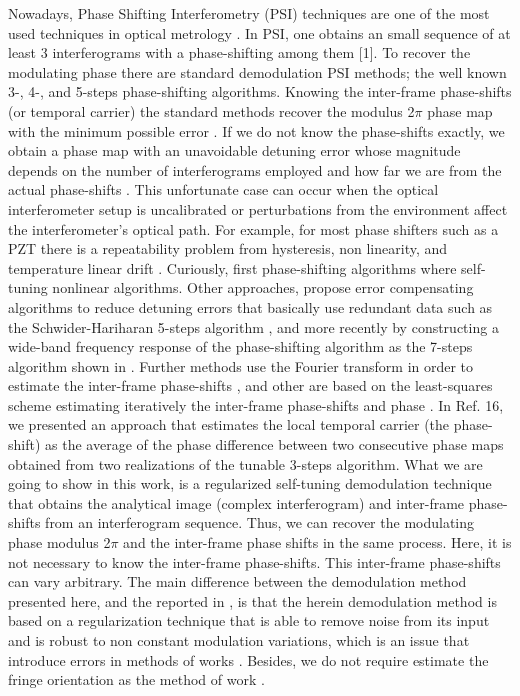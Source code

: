 Nowadays, Phase Shifting Interferometry (PSI) techniques are one of
the most used techniques in optical metrology \cite{Malacara}. In PSI, one
obtains an small sequence of at least 3 interferograms with a phase-shifting
among them {[}1{]}. To recover the modulating phase there are standard
demodulation PSI methods; the well known 3-, 4-, and 5-steps phase-shifting
algorithms. Knowing the inter-frame phase-shifts (or temporal carrier)
the standard methods recover the modulus 2$\pi$ phase map with the
minimum possible error \cite{Malacara,Freischlad:90,Servin:09}. If we
do not know the phase-shifts exactly, we obtain a phase map with an
unavoidable detuning error whose magnitude depends on the number of
interferograms employed and how far we are from the actual phase-shifts
\cite{Servin:09,Schwider:83,Ai:87,Larkin:01,Langoju:06}. This unfortunate case
can occur when the optical
interferometer setup is uncalibrated or perturbations from the environment
affect the interferometer\textquoteright{}s optical path. For example,
for most phase shifters such as a PZT there is a repeatability problem
from hysteresis, non linearity, and temperature linear drift
\cite{Ai:87,Cheng:85}.
Curiously, first phase-shifting algorithms where self-tuning nonlinear
algorithms. Other approaches, propose error compensating
algorithms to reduce detuning errors that basically use redundant
data such as the Schwider-Hariharan 5-steps algorithm
\cite{Schwider:83,Hariharan:87,Surrel:93},
and more recently by constructing a wide-band frequency response of
the phase-shifting algorithm as the 7-steps algorithm shown in
\cite{Estrada:09}.
Further methods use the Fourier transform in order to estimate the
inter-frame phase-shifts \cite{Larkin:01,Lai:91}, and other are based on the
least-squares scheme estimating iteratively the inter-frame phase-shifts
and phase \cite{Kong,Wang:04}. In Ref. 16\cite{Estrada:10}, we presented an
approach that estimates the local temporal carrier (the phase-shift)
as the average of the phase difference between two consecutive phase
maps obtained from two realizations of the tunable 3-steps algorithm.
What we are going to show in this work, is a regularized self-tuning
demodulation technique that obtains the analytical image (complex
interferogram) and inter-frame phase-shifts from an interferogram
sequence. Thus, we can recover the modulating phase modulus 2$\pi$
and the inter-frame phase shifts in the same process. Here, it is
not necessary to know the inter-frame phase-shifts. This inter-frame
phase-shifts can vary arbitrary. The main difference between the demodulation
method presented here, and the reported in \cite{Kong,Wang:04,Larkin:02}, is
that the herein demodulation method is based on a regularization technique
that is able to remove noise from its input and is robust to non constant
modulation variations, which is an issue that introduce errors in
methods of works \cite{Kong,Wang:04}. Besides, we do not require estimate
the fringe orientation as the method of work \cite{Larkin:02}.


